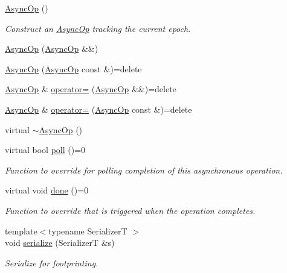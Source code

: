\begin{DoxyCompactItemize}
\item 
\hyperlink{structvt_1_1messaging_1_1_async_op_a4d2f22c0789b0fecbaced56c3129d1d4}{Async\+Op} ()
\begin{DoxyCompactList}\small\item\em Construct an {\ttfamily \hyperlink{structvt_1_1messaging_1_1_async_op}{Async\+Op}} tracking the current epoch. \end{DoxyCompactList}\item 
\hyperlink{structvt_1_1messaging_1_1_async_op_ad00e71b03c2ed178f06630c9443f7a22}{Async\+Op} (\hyperlink{structvt_1_1messaging_1_1_async_op}{Async\+Op} \&\&)
\item 
\hyperlink{structvt_1_1messaging_1_1_async_op_a9c3101ff1458c4c1aa5ab64fbcbbaa1e}{Async\+Op} (\hyperlink{structvt_1_1messaging_1_1_async_op}{Async\+Op} const \&)=delete
\item 
\hyperlink{structvt_1_1messaging_1_1_async_op}{Async\+Op} \& \hyperlink{structvt_1_1messaging_1_1_async_op_a3c1338faf527f023000897296ba94170}{operator=} (\hyperlink{structvt_1_1messaging_1_1_async_op}{Async\+Op} \&\&)=delete
\item 
\hyperlink{structvt_1_1messaging_1_1_async_op}{Async\+Op} \& \hyperlink{structvt_1_1messaging_1_1_async_op_a96df4cbc045ea2a0ebb40f035fff6bcb}{operator=} (\hyperlink{structvt_1_1messaging_1_1_async_op}{Async\+Op} const \&)=delete
\item 
virtual \hyperlink{structvt_1_1messaging_1_1_async_op_adf861ee523573ddd8434b78496a78271}{$\sim$\+Async\+Op} ()
\item 
virtual bool \hyperlink{structvt_1_1messaging_1_1_async_op_a87259770152a18e1ff8127020c6b0e41}{poll} ()=0
\begin{DoxyCompactList}\small\item\em Function to override for polling completion of this asynchronous operation. \end{DoxyCompactList}\item 
virtual void \hyperlink{structvt_1_1messaging_1_1_async_op_aadffda7e94c47714e4da172927783583}{done} ()=0
\begin{DoxyCompactList}\small\item\em Function to override that is triggered when the operation completes. \end{DoxyCompactList}\item 
{\footnotesize template$<$typename SerializerT $>$ }\\void \hyperlink{structvt_1_1messaging_1_1_async_op_a7e6ed5a7acd0ca5dfad62ec366a2983c}{serialize} (SerializerT \&s)
\begin{DoxyCompactList}\small\item\em Serialize for footprinting. \end{DoxyCompactList}\end{DoxyCompactItemize}
